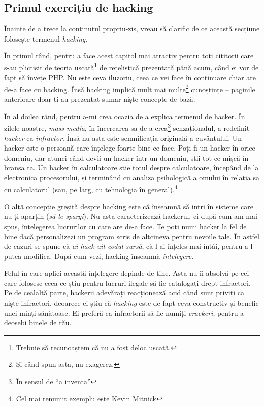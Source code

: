 \subsection{Primul exercițiu de hacking}

Înainte de a trece la conținutul propriu-zis, vreau să clarific de ce această secțiune
folosește termenul \textsl{hacking}.

În primul rând, pentru a face acest capitol mai
atractiv pentru toți cititorii care s-au plictisit de teoria uscată\footnote{Trebuie să
recunoaștem că nu a fost deloc uscată.} de rețelistică
prezentată până acum,
când ei vor de fapt să învețe PHP. Nu este ceva iluzoriu, ceea ce vei face în continuare
chiar are de-a face cu hacking. Însă hacking implică mult mai multe\footnote{Și când
spun asta, nu exagerez.}
cunoștințe -- paginile
anterioare doar ți-au prezentat sumar niște concepte de bază.

În al doilea rând, pentru a-mi crea ocazia de a explica termenul de hacker.
În zilele noastre, \textsl{mass-media}, în încercarea sa de a crea\footnote{În
sensul de ``a inventa''} senzaționalul,
a redefinit \textsl{hacker} ca \textit{infractor}. Însă nu asta este semnificația
originală a cuvântului. Un hacker este o persoană care înțelege foarte bine ce
face. Poți fi un hacker în orice domeniu, dar atunci când devii un hacker într-un domeniu,
știi tot ce mișcă în branșa ta. Un hacker în calculatoare știe totul despre calculatoare,
începând de la electronica procesorului, și terminând cu analiza psihologică a
omului în relația sa cu
calculatorul (sau, pe larg, cu tehnologia în general).\footnote{Cel mai renumit exemplu este
\href{http://en.wikipedia.org/wiki/Kevin_Mitnick}{Kevin Mitnick}}

O altă concepție greșită despre hacking este că înseamnă să intri în sisteme care nu-ți
aparțin (\textit{să le spargi}). Nu asta caracterizează hackerul, ci după cum am mai spus,
înțelegerea lucrurilor cu care are de-a face. Te poți numi hacker la fel de bine
dacă personalizezi un program scris de altcineva pentru nevoile tale. În astfel
de cazuri se spune că \textsl{ai hack-uit codul sursă}, că l-ai înțeles mai întâi, pentru
a-l putea modifica. După cum vezi, hacking înseamnă \textit{înțelegere}.

Felul în care aplici această înțelegere depinde de tine. Asta nu îi absolvă pe
cei care folosesc ceea ce știu pentru lucruri ilegale să fie catalogați
drept infractori. Pe de cealaltă parte, hackerii adevărați reacționează acid
când sunt priviți ca niște infractori, deoarece ei
știu că \textsl{hacking} este de fapt ceva constructiv și benefic unei minți sănătoase.
Ei preferă ca infractorii să fie numiți \textsl{crackeri}, pentru a deosebi binele
de rău.

